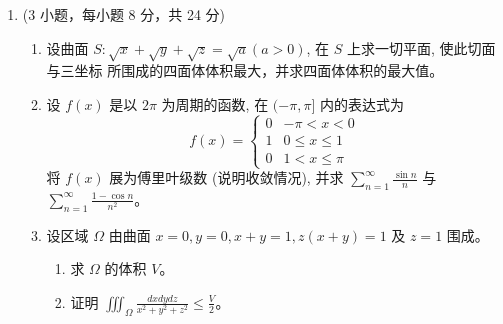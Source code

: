 \begin{enumerate}
{\begin{enumerate}
		分母为零。因此作为原函数的展开式，等式成立于
		\[
		\boxed{[-3,3)}.
		\]
		\item
		因为出现 $\ln y$，先在 $y>0$ 的区间上求解。把 $x$
		看成 $y$ 的函数：
		\[
		\frac{dx}{dy}
		=\frac{x-x^3y^2\ln y}{2y}
		=\frac{x}{2y}-\frac12x^3y\ln y.
		\]
		这是关于 $x(y)$ 的 Bernoulli 方程。令 $u=x^{-2}$，则
		\[
		u'=-2x^{-3}\frac{dx}{dy}
		=-\frac{u}{y}+y\ln y,
		\]
		即
		\[
		u'+\frac1yu=y\ln y.
		\]
		积分因子为 $\exp\!\int dy/y=y$，故
		\[
		(yu)'=y^2\ln y.
		\]
		分部积分得到
		\[
		yu=\int y^2\ln y\,dy
		=\frac{y^3}{3}\ln y-\frac{y^3}{9}+C.
		\]
		代回 $u=x^{-2}$，通解为
		\[
		\boxed{\displaystyle
		\frac{y}{x^2}-\frac{y^3}{3}\ln y+\frac{y^3}{9}=C},
		\qquad y>0,\quad x\ne0.
		\]
	\end{enumerate}
}


\item 
(3 小题，每小题 8 分，共 24 分)
\begin{enumerate}
	\item
设曲面 $S: \sqrt{x}+\sqrt{y}+\sqrt{z}=\sqrt{a}(a>0)$, 在 $S$ 上求一切平面, 使此切面与三坐标 所围成的四面体体积最大，并求四面体体积的最大值。
	
\item
	设 $f(x)$ 是以 $2 \pi$ 为周期的函数, 在 $(-\pi, \pi]$ 内的表达式为
\[
f(x)=\left\{\begin{array}{ll}
	0 & -\pi<x<0 \\
	1 & 0 \leqslant x \leqslant 1 \\
	0 & 1<x \leqslant \pi
\end{array}\right.
\]	
将 $f(x)$ 展为傅里叶级数 (说明收敛情况), 并求 $\sum\limits_{n=1}^{\infty} \frac{\sin n}{n}$ 与 $\sum\limits_{n=1}^{\infty} \frac{1-\cos n}{n^{2}}$。 

\item
设区域 $\Omega$ 由曲面 $x=0, y=0, x+y=1, z(x+y)=1$ 及 $z=1$ 围成。
\begin{enumerate}
	\item
求 $\Omega$ 的体积 $V$。
\item 
证明 $\iiint_{\Omega} \frac{d x d y d z}{x^{2}+y^{2}+z^{2}} \leqslant \frac{V}{2}$。
	

\end{enumerate}
\end{enumerate}
\end{enumerate}
